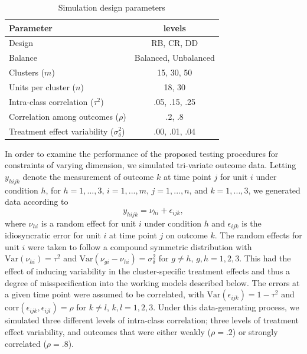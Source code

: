 \documentclass[12pt]{article}\usepackage[]{graphicx}\usepackage[]{color}
\newcommand{\Var}{\text{Var}}
\begin{document}
\begin{table}[tb]
\centering
\caption{Simulation design parameters} 
\label{tab:simulation_parameters}
\begin{tabular}{lc}
\toprule
Parameter & levels \\ \midrule
Design & RB, CR, DD \\
Balance & Balanced, Unbalanced \\
Clusters ($m$) & 15, 30, 50 \\
Units per cluster ($n$) & 18, 30 \\
Intra-class correlation ($\tau^2$) & .05, .15, .25 \\
Correlation among outcomes ($\rho$) & .2, .8 \\
Treatment effect variability ($\sigma_\delta^2$) & .00, .01, .04 \\ 
\bottomrule
\end{tabular}
\end{table}

In order to examine the performance of the proposed testing procedures for constraints of varying dimension, we simulated tri-variate outcome data. 
Letting $y_{hijk}$ denote the measurement of outcome $k$ at time point $j$ for unit $i$ under condition $h$, for $h = 1,...,3$, $i = 1,...,m$, $j = 1,...,n$, and $k = 1,...,3$, we generated data according to 
\begin{equation}
\label{eq:data_generating_model}
y_{hijk} = \nu_{hi} + \epsilon_{ijk},
\end{equation}
where $\nu_{hi}$ is a random effect for unit $i$ under condition $h$ and $\epsilon_{ijk}$ is the idiosyncratic error for unit $i$ at time point $j$ on outcome $k$. 
The random effects for unit $i$ were taken to follow a compound symmetric distribution with $\Var\left(\nu_{hi}\right) = \tau^2$ and $\text{Var}\left(\nu_{gi} - \nu_{hi}\right) = \sigma_\delta^2$ for $g \neq h$, $g,h = 1,2,3$. 
This had the effect of inducing variability in the cluster-specific treatment effects and thus a degree of misspecification into the working models described below. 
The errors at a given time point were assumed to be correlated, with $\Var\left(\epsilon_{ijk}\right) = 1 - \tau^2$ and $\text{corr}\left(\epsilon_{ijk}, \epsilon_{ijl}\right) = \rho$ for $k\neq l$, $k,l = 1,2,3$. 
Under this data-generating process, we simulated three different levels of intra-class correlation; three levels of treatment effect variability, and outcomes that were either weakly ($\rho = .2$) or strongly correlated ($\rho = .8$).
\end{document}
